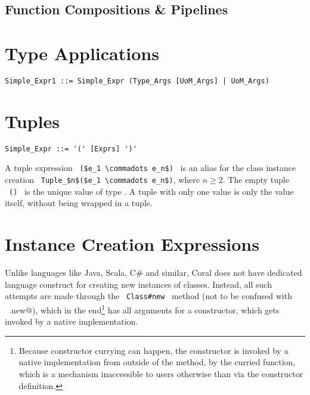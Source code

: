 \subsection{Function Compositions \& Pipelines}






\section{Type Applications}
\label{sec:type-applications}

\syntax\begin{lstlisting}
Simple_Expr1 ::= Simple_Expr (Type_Args [UoM_Args] | UoM_Args)
\end{lstlisting}






\section{Tuples}
\label{sec:tuples}

\syntax\begin{lstlisting}
Simple_Expr ::= '(' [Exprs] ')'
\end{lstlisting}

A tuple expression ~\lstinline!($e_1 \commadots e_n$)!~ is an alias for the class instance creation ~\lstinline!Tuple_$n$($e_1 \commadots e_n$)!, where $n \geq 2$. The empty tuple ~\lstinline!()!~ is the unique value of type . A tuple with only one value is only the value itself, without being wrapped in a tuple. 






\section{Instance Creation Expressions}
\label{sec:instance-creation-exprs}

Unlike languages like Java, Scala, C\# and similar, Coral does not have dedicated language construct for creating new instances of classes. Instead, all such attempts are made through the ~\lstinline!Class#new!~ method (not to be confused with ~\lstinline@Class.new@), which in the end\footnote{Because constructor currying can happen, the constructor is invoked by a native implementation from outside of the  method, by the curried function, which is a mechanism inaccessible to users otherwise than via the constructor definition.} has all arguments for a constructor, which gets invoked by a native implementation. 






